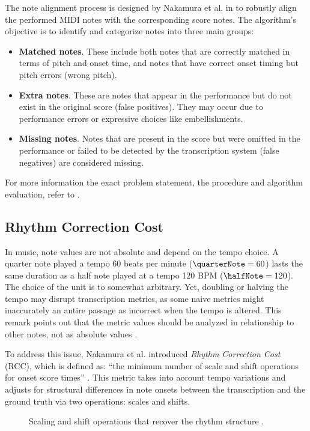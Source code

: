 The note alignment process is designed by Nakamura et al. in \cite{Nakamura2017b} to robustly align the performed MIDI notes with the corresponding score notes. The algorithm's objective is to identify and categorize notes into three main groups: \begin{itemize}
	\item {\bf Matched notes}. These include both notes that are correctly matched in terms of pitch and onset time, and notes that have correct onset timing but pitch errors (wrong pitch).
	\item {\bf Extra notes}. These are notes that appear in the performance but do not exist in the original score (false positives). They may occur due to performance errors or expressive choices like embellishments.
	\item {\bf Missing notes}. Notes that are present in the score but were omitted in the performance or failed to be detected by the transcription system (false negatives) are considered missing.
\end{itemize}

For more information the exact problem statement, the procedure and algorithm evaluation, refer to \cite{Nakamura2017b}.

\subsection{Rhythm Correction Cost}

In music, note values are not absolute and depend on the tempo choice. A quarter note played a tempo $60$ beats per minute ($\quarterNote = 60$) lasts the same duration as a half note played at a tempo 120 BPM ($\halfNote = 120$). The choice of the unit is to somewhat arbitrary. Yet, doubling or halving the tempo may disrupt transcription metrics, as some naive metrics might inaccurately an antire passage as incorrect when the tempo is altered. This remark points out that the metric values should be analyzed in relationship to other notes, not as absolute values \cite{Nakamura2017c}.

To address this issue, Nakamura et al. introduced \emph{Rhythm Correction Cost} (RCC), which is defined as: ``the minimum number of scale and shift operations for onset score times'' \cite{Nakamura2017b}. This metric takes into account tempo variations and adjusts for structural differences in note onsets between the transcription and the ground truth via two operations: scales and shifts.

\begin{figure}[ht!]
\centering

\caption[Scaling and shift operations that recover the rhythm structure]{Scaling and shift operations that recover the rhythm structure \cite{Nakamura2017b}.}
\label{rhythm_correction}
\end{figure}

